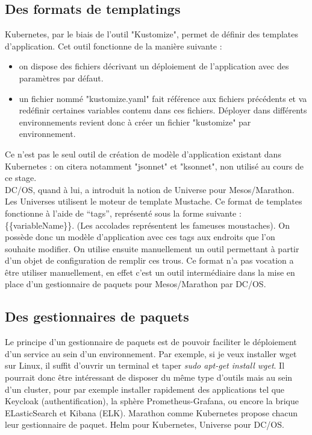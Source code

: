 \documentclass[11pt,fleqn]{book} %
\begin{document}
\subsection{Des formats de templatings}
Kubernetes, par le biais de l'outil "Kustomize", permet de définir des templates d'application. Cet outil fonctionne de la manière suivante :
\begin{itemize}
    \item on dispose des fichiers décrivant un déploiement de l'application avec des paramètres par défaut.
    \item un fichier nommé "kustomize.yaml"  fait référence aux fichiers précédents et va redéfinir certaines variables contenu dans ces fichiers.
    Déployer dans différents environnements revient donc à créer un fichier "kustomize" par environnement.
\end{itemize}
Ce n'est pas le seul outil de création de modèle d'application existant dans Kubernetes : on citera notamment "jsonnet" et "ksonnet", non utilisé au cours de ce stage.\\ 

DC/OS, quand à lui, a introduit la notion de Universe pour Mesos/Marathon. Les Universes utilisent le moteur de template Mustache. 
Ce format de templates fonctionne à l’aide de “tags”, représenté sous la forme suivante : \{\{variableName\}\}. (Les accolades représentent les fameuses moustaches). On possède donc un modèle d'application avec ces tags aux endroits que l'on souhaite modifier. On utilise ensuite manuellement un outil permettant à partir d'un objet de configuration de remplir ces trous. Ce format n'a pas vocation a être utiliser manuellement, en effet c'est un outil intermédiaire dans la mise en place d'un gestionnaire de paquets pour Mesos/Marathon par DC/OS.


\subsection{Des gestionnaires de paquets}
Le principe d'un gestionnaire de paquets est de pouvoir faciliter le déploiement d'un service au sein d'un environnement. Par exemple, si je veux installer wget sur Linux, il suffit d'ouvrir un terminal et taper \textit{sudo apt-get install wget}. Il pourrait donc être intéressant de disposer du même type d'outils mais au sein d'un cluster, pour par exemple installer rapidement des applications tel que Keycloak (authentification), la sphère Prometheus-Grafana, ou encore la brique ELasticSearch et Kibana (ELK). Marathon comme Kubernetes propose chacun leur gestionnaire de paquet. Helm pour Kubernetes, Universe pour DC/OS. \\
\end{document}
